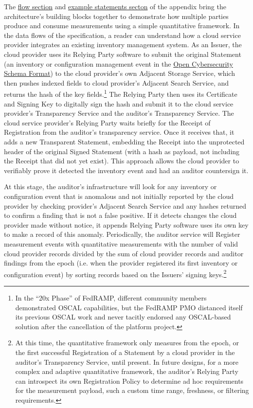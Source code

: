 \documentclass{jdf}
\begin{document}
The \href{https://github.com/aj-stein/practicum/pull/1}{flow section} and \href{https://aj-stein.github.io/conmotion/architecture.html#example-statements}{example statements secton} of the appendix bring the architecture's building blocks together to demonstrate how multiple parties produce and consume measurements using a simple quantitative framework. In the data flows of the specification, a reader can understand how a cloud service provider integrates an existing inventory management system. As an Issuer, the cloud provider uses its Relying Party software to submit the original Statement (an inventory or configuration management event in the \href{https://schema.ocsf.io/}{Open Cybersecurity Schema Format}) to the cloud provider's own Adjacent Storage Service, which then pushes indexed fields to cloud provider's Adjacent Search Service, and returns the hash of the key fields.\footnote{In the ``20x Phase'' of FedRAMP, different community members demonstrated OSCAL capabilities, but the FedRAMP PMO distanced itself its previous OSCAL work and never tacitly endorsed any OSCAL-based solution after the cancellation of the platform project.} The Relying Party then uses its Certificate and Signing Key to digitally sign the hash and submit it to the cloud service provider's Transparency Service and the auditor's Transparency Service. The cloud service provider's Relying Party waits briefly for the Receipt of Registration from the auditor's transparency service. Once it receives that, it adds a new Transparent Statement, embedding the Receipt into the unprotected header of the original Signed Statement (with a hash as payload, not including the Receipt that did not yet exist). This approach allows the cloud provider to verifiably prove it detected the inventory event and had an auditor countersign it. 

At this stage, the auditor's infrastructure will look for any inventory or configuration event that is anomalous and not initially reported by the cloud provider by checking provider's Adjacent Search Service and any hashes returned to confirm a finding that is not a false positive. If it detects changes the cloud provider made without notice, it appends Relying Party software uses its own key to make a record of this anomaly. Periodically, the auditor service will Register measurement events with quantitative measurements with the number of valid cloud provider records divided by the sum of cloud provider records and auditor findings from the epoch (i.e. when the provider registered its first inventory or configuration event) by sorting records based on the Issuers' signing keys.\footnote{At this time, the quantitative framework only measures from the epoch, or the first successful Registration of a Statement by a cloud provider in the auditor's Transparency Service, until present. In future designs, for a more complex and adaptive quantitative framework, the auditor's Relying Party can introspect its own Registration Policy to determine ad hoc requirements for the measurement payload, such a custom time range, freshness, or filtering requirements.}
\end{document}
